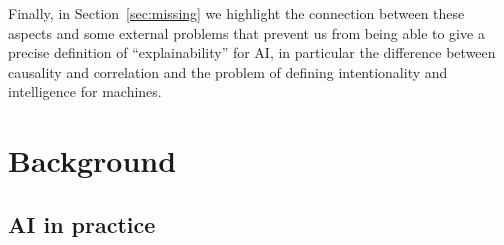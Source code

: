 \documentclass[conference]{IEEEtran}
\newcommand{\cit}[1][]{\todo[tickmarkheight=0.2cm]{cit #1}}
\begin{document}
Finally, in Section~\ref{sec:missing} we highlight the connection between these aspects and some external problems that prevent us from being able to give a precise definition of ``explainability'' for AI, in particular the difference between causality and correlation and the problem of defining intentionality and intelligence for machines.

\section{Background}
\label{sec:background}







\subsection{AI in practice}
\label{sec:aiprog}
\end{document}
